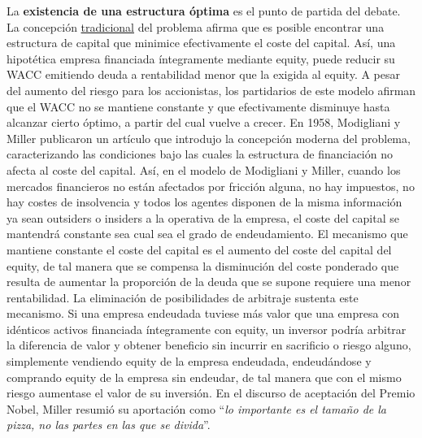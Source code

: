 \documentclass{nuevotema}
\begin{document}
La \textbf{existencia de una estructura óptima} es el punto de partida del debate. La concepción \underline{tradicional} del problema afirma que es posible encontrar una estructura de capital que minimice efectivamente el coste del capital. Así, una hipotética empresa financiada íntegramente mediante equity, puede reducir su WACC emitiendo deuda a rentabilidad menor que la exigida al equity. A pesar del aumento del riesgo para los accionistas, los partidarios de este modelo afirman que el WACC no se mantiene constante y que efectivamente disminuye hasta alcanzar cierto óptimo, a partir del cual vuelve a crecer. En 1958, Modigliani y Miller publicaron un artículo que introdujo la concepción moderna del problema, caracterizando las condiciones bajo las cuales la estructura de financiación no afecta al coste del capital. Así, en el modelo de Modigliani y Miller, cuando los mercados financieros no están afectados por fricción alguna, no hay impuestos, no hay costes de insolvencia y todos los agentes disponen de la misma información ya sean outsiders o insiders a la operativa de la empresa, el coste del capital se mantendrá constante sea cual sea el grado de endeudamiento. El mecanismo que mantiene constante el coste del capital es el aumento del coste del capital del equity, de tal manera que se compensa la disminución del coste ponderado que resulta de aumentar la proporción de la deuda que se supone requiere una menor rentabilidad. La eliminación de posibilidades de arbitraje sustenta este mecanismo. Si una empresa endeudada tuviese más valor que una empresa con idénticos activos financiada íntegramente con equity, un inversor podría arbitrar la diferencia de valor y obtener beneficio sin incurrir en sacrificio o riesgo alguno, simplemente vendiendo equity de la empresa endeudada, endeudándose y comprando equity de la empresa sin endeudar, de tal manera que con el mismo riesgo aumentase el valor de su inversión. En el discurso de aceptación del Premio Nobel, Miller resumió su aportación como ``\textit{lo importante es el tamaño de la pizza, no las partes en las que se divida}''. 
\end{document}

